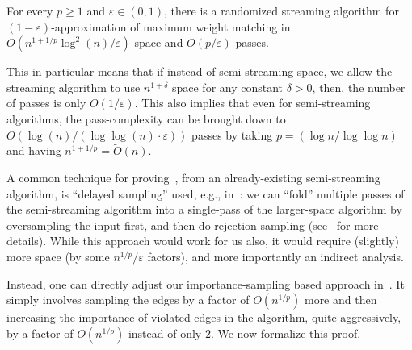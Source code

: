 \documentclass{article}
\renewcommand{\geq}{\geqslant}
\newcommand{\Ot}{\widetilde{O}}
\newcommand{\eps}{\varepsilon}
\begin{document}
\begin{corollary}\label{cor:eps-pass} For every  $p \geq 1$ and  $\eps \in (0,1)$, there is a randomized streaming algorithm for $(1-\eps)$-approximation of maximum weight matching
	in $O(n^{1+1/p}  \log^2{\!(n)}/\eps)$ space and $O(p/\eps)$ passes. 
\end{corollary}

This in particular means that if instead of semi-streaming space, we allow the streaming algorithm to use $n^{1+\delta}$ space for any constant $\delta > 0$, then, the number of passes is only $O(1/\eps)$. 
This also implies that even for semi-streaming algorithms, the pass-complexity can be brought down to $O(\log{\!(n)}/(\log\log{\!(n)} \cdot \eps))$ passes by taking $p=(\log{n}/\log\log{n})$ and having $n^{1+1/p} = \Ot(n)$. 

A common technique for proving~, from an already-existing semi-streaming algorithm, is ``delayed sampling'' used, e.g., in~\cite{AhnG15,IndykMRUVY17}: 
we can ``fold'' multiple passes of the semi-streaming algorithm into a single-pass of the larger-space algorithm by oversampling the input first, and then do rejection sampling 
(see~\cite[step 2 of Section 1.3]{IndykMRUVY17} for more details). While this approach would work for us also, 
it would require (slightly) more space  (by some $n^{1/p}/\eps$ factors), and more importantly an indirect analysis. 

Instead, one can directly adjust our importance-sampling based approach in~. 
It simply involves sampling the edges by a factor of $O(n^{1/p})$ more and then  increasing the importance of violated edges in the algorithm, quite aggressively, by a factor of $O(n^{1/p})$ instead of only $2$. 
We now formalize this proof. 
\end{document}
